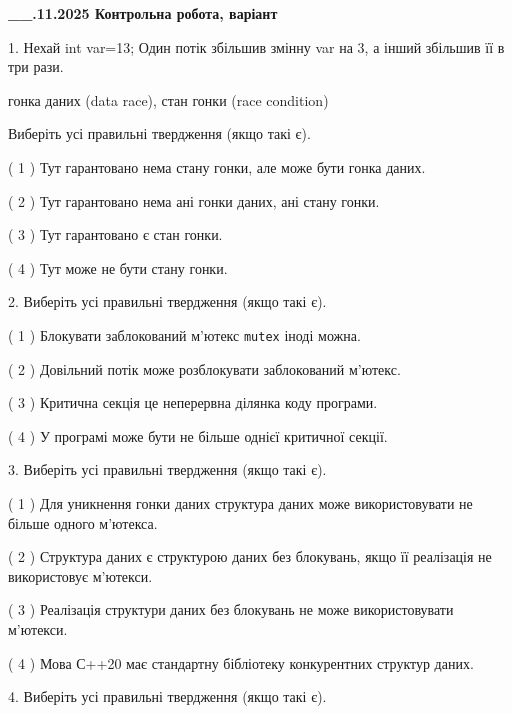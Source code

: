 \documentclass[12pt, ukrainian]{article}
\def\code#1{\Verb!#1!}
\begin{document}
\newpage
\begin {large}

\textbf{\_\_.11.2025 Контрольна робота, варіант  }\par


{
1. Нехай int var=13; Один потік збільшив змінну var на 3, а інший збільшив її в три рази.

гонка даних (data race), стан гонки (race condition)

Виберіть усі правильні твердження (якщо такі є).\par
\vspace{2mm}
( 1 ) Тут гарантовано нема стану гонки, але може бути гонка даних.%

( 2 ) Тут гарантовано нема ані гонки даних, ані стану гонки.%

( 3 ) Тут гарантовано є стан гонки.%

( 4 ) Тут може не бути стану гонки.%


2. Виберіть усі правильні твердження (якщо такі є).\par
\vspace{2mm}

( 1 ) Блокувати заблокований м’ютекс  \code{mutex} іноді можна.%

( 2 ) Довільний потік може розблокувати заблокований м’ютекс.%

( 3 ) Критична секція це неперервна ділянка коду програми.%

( 4 ) У програмі може бути не більше однієї критичної секції.%


3. Виберіть усі правильні твердження (якщо такі є).\par
\vspace{2mm}

( 1 ) Для уникнення гонки даних структура даних може використовувати не більше одного м’ютекса.%

( 2 ) Структура даних є структурою даних без блокувань, якщо її реалізація не використовує м’ютекси.%

( 3 ) Реалізація структури даних без блокувань не може використовувати м’ютекси.%

( 4 ) Мова С++20 має стандартну бібліотеку конкурентних структур даних.%


4. Виберіть усі правильні твердження (якщо такі є).\par
\vspace{2mm}

}
\end{large}
\end{document}
